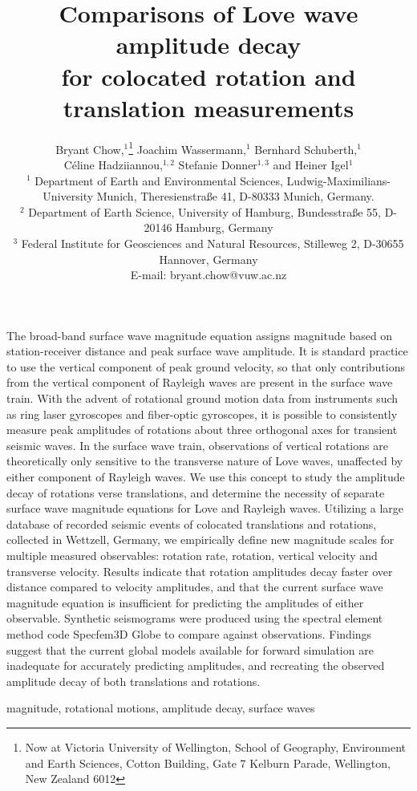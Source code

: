 \documentclass{gji}
\title[Comparisons of Love wave amplitude decay]
  {Comparisons of Love wave amplitude decay \\for colocated rotation and translation measurements}
\author[Bryant Chow]
  {Bryant Chow,$^1$\thanks{Now at Victoria University of Wellington, School of Geography, Environment and Earth Sciences, Cotton Building, Gate 7 Kelburn Parade, Wellington, New Zealand 6012} 
  Joachim Wassermann,$^1$
  Bernhard Schuberth,$^1$  \vspace{2mm}\\
  \LARGE{{\normalfont C\' eline Hadziiannou,$^{1,2}$ 
  Stefanie Donner$^{1,3}$ and
   Heiner Igel$^1$}}\vspace{2mm}  \\
  $^1$ Department of Earth and Environmental Sciences, Ludwig-Maximilians-University Munich, Theresienstra\ss e 41, D-80333 Munich, Germany.\\
  $^2$ Department of Earth Science, University of Hamburg, Bundesstra\ss e 55, D-20146 Hamburg, Germany\\
  $^3$ Federal Institute for Geosciences and Natural Resources, Stilleweg 2, D-30655 Hannover, Germany \\E-mail: bryant.chow@vuw.ac.nz
  }
\date{}
\begin{document}
\label{firstpage}

\maketitle

\begin{summary}
The broad-band surface wave magnitude equation assigns magnitude based on station-receiver distance and peak surface wave amplitude. It is standard practice to use the vertical component of peak ground velocity, so that only contributions from the vertical component of Rayleigh waves are present in the surface wave train. With the advent of rotational ground motion data from instruments such as ring laser gyroscopes and fiber-optic gyroscopes, it is possible to consistently measure peak amplitudes of rotations about three orthogonal axes for transient seismic waves. In the surface wave train, observations of vertical rotations are theoretically only sensitive to the transverse nature of Love waves, unaffected by either component of Rayleigh waves. We use this concept to study the amplitude decay of rotations verse translations, and determine the necessity of separate surface wave magnitude equations for Love and Rayleigh waves. Utilizing a large database of recorded seismic events of colocated translations and rotations, collected in Wettzell, Germany, we empirically define new magnitude scales for multiple measured observables: rotation rate, rotation, vertical velocity and transverse velocity. Results indicate that rotation amplitudes decay faster over distance compared to velocity amplitudes, and that the current surface wave magnitude equation is insufficient for predicting the amplitudes of either observable. Synthetic seismograms were produced using the spectral element method code Specfem3D Globe to compare against observations. Findings suggest that the current global models available for forward simulation are inadequate for accurately predicting amplitudes, and recreating the observed amplitude decay of both translations and rotations.
\end{summary}

\begin{keywords}
magnitude, rotational motions, amplitude decay, surface waves
\end{keywords}
\end{document}
